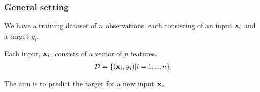 \begin{frame}
\frametitle{General setting}
We have a training dataset of $n$ observations, each consisting of an input ${\bf x}_i$ and a target $y_i$.\par
Each input, ${\bf x}_i$, consists of a vector of $p$ features.
\begin{align*}
\mathcal{D} = \{({\bf x}_i,y_i) | i=1,..,n\}
\end{align*}

The aim is to predict the target for a new input ${\bf x}_*$.
\end{frame}

